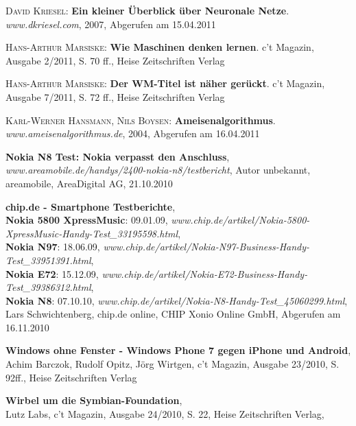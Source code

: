 \begin{thebibliography}{---}

  \textsc{David Kriesel}: 
  \textbf{Ein kleiner Überblick über Neuronale Netze}.
  \emph{www.dkriesel.com}, 2007, Abgerufen am 15.04.2011



  \textsc{Hans-Arthur Marsiske}: 
  \textbf{Wie Maschinen denken lernen}.
  c't Magazin, Ausgabe 2/2011, S. 70 ff., Heise Zeitschriften Verlag

  \textsc{Hans-Arthur Marsiske}: 
  \textbf{Der WM-Titel ist näher gerückt}.
  c't Magazin, Ausgabe 7/2011, S. 72 ff., Heise Zeitschriften Verlag

  \textsc{Karl-Werner Hansmann, Nils Boysen}: 
  \textbf{Ameisenalgorithmus}.
  \emph{www.ameisenalgorithmus.de}, 2004, Abgerufen am 16.04.2011


	
	\textbf{Nokia N8 Test: Nokia verpasst den Anschluss}, \\
	\emph{www.areamobile.de/handys/2400-nokia-n8/testbericht},
	Autor unbekannt, areamobile, AreaDigital AG, 21.10.2010
		
	\textbf{chip.de - Smartphone Testberichte},\\
	\textbf{Nokia 5800 XpressMusic}: 09.01.09, \emph{www.chip.de/artikel/Nokia-5800-XpressMusic-Handy-Test\_33195598.html},\\
	\textbf{Nokia N97}: 18.06.09, \emph{www.chip.de/artikel/Nokia-N97-Business-Handy-Test\_33951391.html},\\
	\textbf{Nokia E72}: 15.12.09, \emph{www.chip.de/artikel/Nokia-E72-Business-Handy-Test\_39386312.html},\\
	\textbf{Nokia N8}: 07.10.10, \emph{www.chip.de/artikel/Nokia-N8-Handy-Test\_45060299.html},\\
	Lars Schwichtenberg, chip.de online, CHIP Xonio Online GmbH, Abgerufen am 16.11.2010 
	
	\textbf{Windows ohne Fenster - Windows Phone 7 gegen iPhone und Android},\\
	Achim Barczok, Rudolf Opitz, Jörg Wirtgen, c't Magazin, Ausgabe 23/2010, S. 92ff., Heise Zeitschriften Verlag

	\textbf{Wirbel um die Symbian-Foundation},\\
	Lutz Labs, c't Magazin, Ausgabe 24/2010, S. 22, Heise Zeitschriften Verlag,
	
\end{thebibliography}

